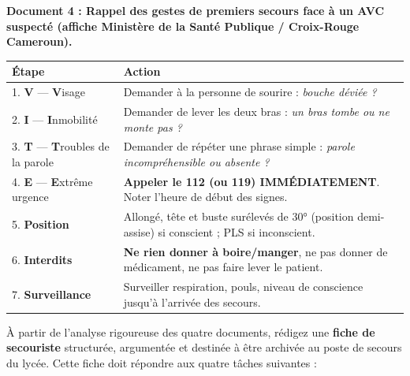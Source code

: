 \documentclass[11pt]{article}
\newcounter{popsec}
\newcounter{popsub}
\newcommand{\courssub}[1]{%
  \stepcounter{popsub}%
  \par\vspace{9pt}\noindent{\popxbold\fontsize{11.5}{13}\selectfont\color{popink}{\color{poporange}\thepopsec.\thepopsub}\hspace{6pt}#1}\par\nopagebreak\vspace{4pt}
}
\begin{document}
\medskip
\noindent \textbf{Document 4 : Rappel des gestes de premiers secours face à un AVC suspecté (affiche Ministère de la Santé Publique / Croix-Rouge Cameroun).}
\begin{center}
\begin{tabularx}{\linewidth}{|l|X|}\hline
\rowcolor{popblueL} \textbf{Étape} & \textbf{Action} \\ \hline
1. \textbf{V} — \textbf{V}isage & Demander à la personne de sourire : \emph{bouche déviée ?} \\ \hline
2. \textbf{I} — \textbf{I}nmobilité & Demander de lever les deux bras : \emph{un bras tombe ou ne monte pas ?} \\ \hline
3. \textbf{T} — \textbf{T}roubles de la parole & Demander de répéter une phrase simple : \emph{parole incompréhensible ou absente ?} \\ \hline
4. \textbf{E} — \textbf{E}xtrême urgence & \textbf{Appeler le 112 (ou 119) IMMÉDIATEMENT}. Noter l'heure de début des signes. \\ \hline
5. \textbf{Position} & Allongé, tête et buste surélevés de 30° (position demi-assise) si conscient ; PLS si inconscient. \\ \hline
6. \textbf{Interdits} & \textbf{Ne rien donner à boire/manger}, ne pas donner de médicament, ne pas faire lever le patient. \\ \hline
7. \textbf{Surveillance} & Surveiller respiration, pouls, niveau de conscience jusqu'à l'arrivée des secours. \\ \hline
\end{tabularx}
\end{center}

\courssub{Consignes}
À partir de l'analyse rigoureuse des quatre documents, rédigez une \textbf{fiche de secouriste} structurée, argumentée et destinée à être archivée au poste de secours du lycée. Cette fiche doit répondre aux quatre tâches suivantes :
\end{document}
